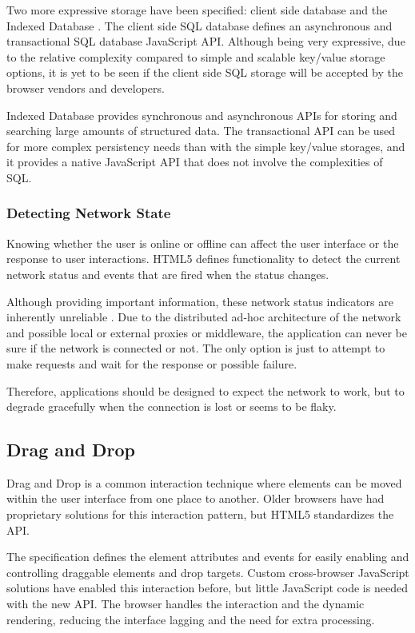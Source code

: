 Two more expressive storage  have been specified: client
side  database \cite{webstoragedraft} and the Indexed
Database \cite{indexedDBdraft}. The client side SQL database defines
an asynchronous and transactional SQL database JavaScript
API. Although being very expressive, due to the relative complexity
compared to simple and scalable key/value storage options, it is yet
to be seen if the client side SQL storage will be accepted by the
browser vendors and developers.

Indexed Database provides synchronous and asynchronous APIs for
storing and searching large amounts of structured data. The
transactional API can be used for more complex persistency needs than
with the simple key/value storages, and it provides a native
JavaScript API that does not involve the complexities of SQL.

\subsubsection{Detecting Network State}

Knowing whether the user is online or offline can affect the user
interface or the response to user interactions. HTML5 defines
functionality to detect the current network status and events that are
fired when the status changes. \cite{HTML5draft}

Although providing important information, these network status
indicators are inherently unreliable \cite{HTML5draft}. Due to the
distributed ad-hoc architecture of the network and possible local or
external proxies or middleware, the application can never be sure if
the network is connected or not. The only option is just to attempt to
make requests and wait for the response or possible failure.

Therefore, applications should be designed to expect the network to
work, but to degrade gracefully when the connection is lost or seems
to be flaky.

\subsection{Drag and Drop}
\label{section:dragdrop}

Drag and Drop is a common interaction technique where elements can be
moved within the user interface from one place to another. Older
browsers have had proprietary solutions for this interaction pattern,
but HTML5 standardizes the API.

The specification defines the element attributes and  events
for easily enabling and controlling draggable elements and drop
targets. Custom cross-browser JavaScript solutions have enabled this
interaction before, but little JavaScript code is needed with the new
API. The browser handles the interaction and the dynamic rendering,
reducing the interface lagging and the need for extra processing.


